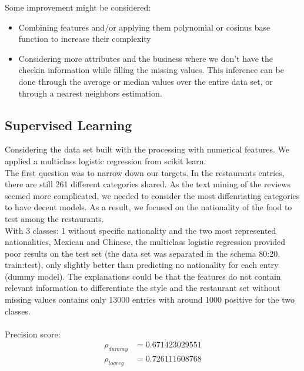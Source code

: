 \documentclass[paper=a4, fontsize=11pt]{scrartcl} %
\numberwithin{equation}{section}
\numberwithin{figure}{section}
\numberwithin{table}{section}
\begin{document}
Some improvement might be considered:
\begin{itemize}
	\item Combining features and/or applying them polynomial or cosinus base function to increase their complexity
	\item Considering more attributes and the business where we don't have the checkin information while filling the missing values. This inference can be done through the average or median values over the entire data set, or through a nearest neighbors estimation.
\end{itemize}

\subsection{Supervised Learning} 

Considering the data set built with the processing with numerical features. We applied a multiclass logistic regression from scikit learn. \\

The first question was to narrow down our targets. In the restaurants entries, there are still 261 different categories shared. As the text mining of the reviews seemed more complicated, we needed to consider the most diffenriating categories to have decent models. As a result, we focused on the nationality of the food to test among the restaurants.\\

With 3 classes: 1 without specific nationality and the two most represented nationalities, Mexican and Chinese, the multiclass logistic regression provided poor results on the test set (the data set was separated in the schema 80:20, train:test), only slightly better than predicting no nationality for each entry (dummy model). The explanations could be that the features do not contain relevant information to differentiate the style and the restaurant set without missing values contains only 13000 entries with around 1000 positive for the two classes.\\\\
Precision score:
\begin{align*}
	\rho_{dummy} & = 0.671423029551 \\
	\rho_{logreg} &  = 0.726111608768 
\end{align*}
\end{document}
